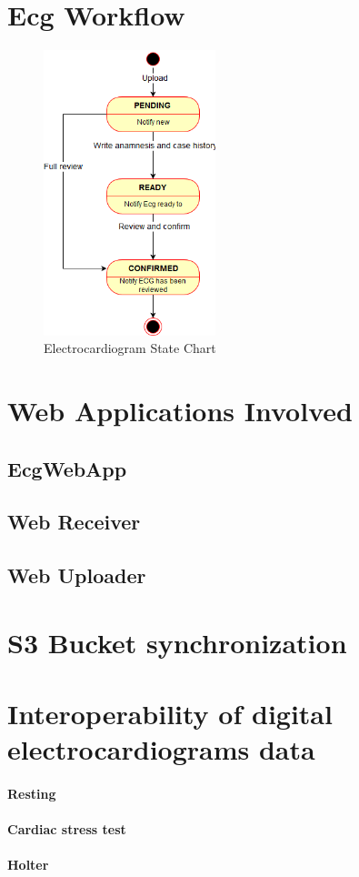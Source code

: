 \section{Ecg Workflow}
\begin{figure}[h]
    \includegraphics[width=5cm]{ECGstatechart}
    \caption{Electrocardiogram State Chart}
    \label{fig:ECGstatechart}
\end{figure}
\section{Web Applications Involved}
\subsection{EcgWebApp}
\subsection{Web Receiver}
\subsection{Web Uploader}
\section{S3 Bucket synchronization}
\section{Interoperability of digital electrocardiograms data}
\paragraph{Resting}
\paragraph{Cardiac stress test}
\paragraph{Holter}

\label{par:webreceiver}


